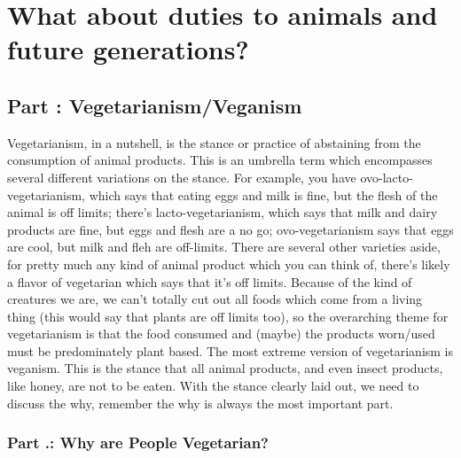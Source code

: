 \part{What about duties to animals and future generations?}
\label{ch.modten}
\chapter{Part \thechapcount: Vegetarianism/Veganism}\setcounter{seccount}{1}

Vegetarianism, in a nutshell, is the stance or practice of abstaining from the consumption of animal products. This is an umbrella term which encompasses several different variations on the stance. For example, you have ovo-lacto-vegetarianism, which says that eating eggs and milk is fine, but the flesh of the animal is off limits; there's lacto-vegetarianism, which says that milk and dairy products are fine, but eggs and flesh are a no go; ovo-vegetarianism says that eggs are cool, but milk and fleh are off-limits. There are several other varieties aside, for pretty much any kind of animal product which you can think of, there's likely a flavor of vegetarian which says that it's off limits. Because of the kind of creatures we are, we can't totally cut out all foods which come from a living thing (this would say that plants are off limits too), so the overarching theme for vegetarianism is that the food consumed and (maybe) the products worn/used must be predominately plant based.  The most extreme version of vegetarianism is veganism. This is the stance that all animal products, and even insect products, like honey, are not to be eaten. With the stance clearly laid out, we need to discuss the why, remember the why is always the most important part.
\section{Part \thechapcount.\theseccount: Why are People Vegetarian?}  

